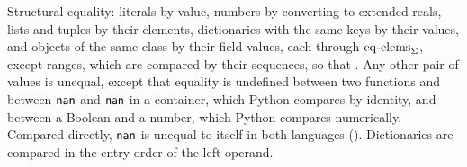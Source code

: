Structural equality: literals by value, numbers by converting to extended reals, lists and tuples by their elements, dictionaries with the same
keys by their values, and objects of the same class by their field values, each through $\mathrm{eq\text{-}elems}_{\Sigma}$, except ranges,
which are compared by their sequences, so that . Any other pair of values is unequal, except that equality is undefined between two functions and between $\mathsf{nan}$ and $\mathsf{nan}$ in a container, which Python compares by identity, and between a Boolean and a number, which Python compares numerically. Compared directly, $\mathsf{nan}$ is unequal to itself in both languages ().
Dictionaries are compared in the entry order of the left operand.
